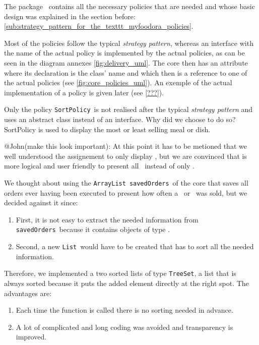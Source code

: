 The package \policies~contains all the necessary policies that are needed and whose basic design was explained in the section before:  \ref{sub:strategy_pattern_for_the_texttt_myfoodora_policies}. 

Most of the policies follow the typical \emph{strategy pattern}, whereas an interface with the name of the actual policy is implemented by the actual policies, as can be seen in the diagram annexes \ref{fig:delivery_uml}. The core then has an attribute where its declaration is the class' name and which then is a reference to one of the actual policies (see \ref{fig:core_policies_uml}). An exemple of the actual implementation of a policy is given later (see \ref{???}).

Only the policy \lstinline|SortPolicy|~is not realised after the typical \emph{strategy pattern} and uses an abstract class instead of an interface. Why did we choose to do so? SortPolicy is used to display the most or least selling meal or dish. 

@John(make this look important): At this point it has to be metioned that we well understood the assignement to only display \HalfMeal, but we are convinced that is more logical and user friendly to present all \Meal~instead of only \HalfMeal. 

We thought about using the \lstinline|ArrayList|~\lstinline|savedOrders|~of the core that saves all orders ever having been executed to present how often a \Meal~or \Dish~was sold, but we decided against it since: 

\begin{enumerate}
	\item First, it is not easy to extract the needed information from \lstinline|savedOrders|~because it contains objects of type \Order.
	\item Second, a new \lstinline|List|~would have to be created that has to sort all the needed information.
\end{enumerate}

Therefore, we implemented a two sorted lists of type \lstinline|TreeSet|, a list that is always sorted because it puts the added element directly at the right spot. The advantages are:

\begin{enumerate}
	\item Each time the function is called there is no sorting needed in advance.
	\item A lot of complicated and long coding was avoided and transparency is improved.
\end{enumerate}

